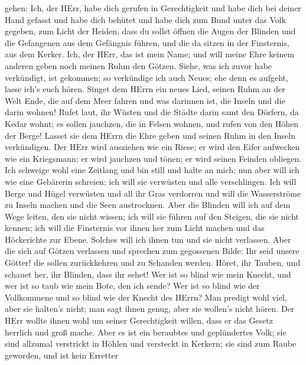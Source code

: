 gehen:  Ich, der HErr, habe dich gerufen in Gerechtigkeit
und habe dich bei deiner Hand gefasst und habe dich behütet und habe
dich zum Bund unter das Volk gegeben, zum Licht der Heiden, 
dass du sollst öffnen die Augen der Blinden und die Gefangenen aus dem
Gefängnis führen, und die da sitzen in der Finsternis, aus dem Kerker.
 Ich, der HErr, das ist mein Name; und will meine Ehre
keinem anderen geben noch meinen Ruhm den Götzen.  Siehe,
was ich zuvor habe verkündigt, ist gekommen; so verkündige ich auch
Neues; ehe denn es aufgeht, lasse ich's euch hören.  Singet
dem HErrn ein neues Lied, seinen Ruhm an der Welt Ende, die auf dem Meer
fahren und was darinnen ist, die Inseln und die darin wohnen!
 Rufet laut, ihr Wüsten und die Städte darin samt den
Dörfern, da Kedar wohnt; es sollen jauchzen, die in Felsen wohnen, und
rufen von den Höhen der Berge!  Lasset sie dem HErrn die
Ehre geben und seinen Ruhm in den Inseln verkündigen.  Der
HErr wird ausziehen wie ein Riese; er wird den Eifer aufwecken wie ein
Kriegsmann; er wird jauchzen und tönen; er wird seinen Feinden obliegen.
 Ich schweige wohl eine Zeitlang und bin still und halte an
mich; nun aber will ich wie eine Gebärerin schreien; ich will sie
verwüsten und alle verschlingen.  Ich will Berge und Hügel
verwüsten und all ihr Gras verdorren und will die Wasserströme zu Inseln
machen und die Seen austrocknen.  Aber die Blinden will ich
auf dem Wege leiten, den sie nicht wissen; ich will sie führen auf den
Steigen, die sie nicht kennen; ich will die Finsternis vor ihnen her zum
Licht machen und das Höckerichte zur Ebene. Solches will ich ihnen tun
und sie nicht verlassen.  Aber die sich auf Götzen
verlassen und sprechen zum gegossenen Bilde: Ihr seid unsere Götter! die
sollen zurückkehren und zu Schanden werden.  Höret, ihr
Tauben, und schauet her, ihr Blinden, dass ihr sehet!  Wer
ist so blind wie mein Knecht, und wer ist so taub wie mein Bote, den ich
sende? Wer ist so blind wie der Vollkommene und so blind wie der Knecht
des HErrn?  Man predigt wohl viel, aber sie halten's nicht;
man sagt ihnen genug, aber sie wollen's nicht hören.  Der
HErr wollte ihnen wohl um seiner Gerechtigkeit willen, dass er das
Gesetz herrlich und groß mache.  Aber es ist ein beraubtes
und geplündertes Volk; sie sind allzumal verstrickt in Höhlen und
versteckt in Kerkern; sie sind zum Raube geworden, und ist kein Erretter
